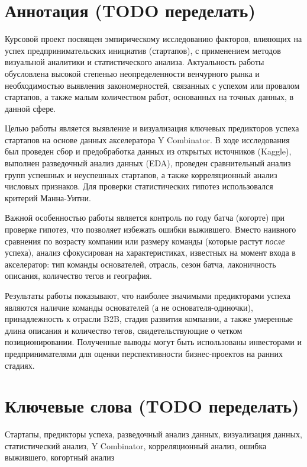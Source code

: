 \section*{Аннотация (TODO переделать)}
Курсовой проект посвящен эмпирическому исследованию факторов, влияющих на успех предпринимательских инициатив (стартапов), с применением методов визуальной аналитики и статистического анализа. Актуальность работы обусловлена высокой степенью неопределенности венчурного рынка и необходимостью выявления закономерностей, связанных с успехом или провалом стартапов, а также малым количеством работ, основанных на точных данных, в данной сфере.

Целью работы является выявление и визуализация ключевых предикторов успеха стартапов на основе данных акселератора Y Combinator. В ходе исследования был проведен сбор и предобработка данных из открытых источников (Kaggle), выполнен разведочный анализ данных (EDA), проведен сравнительный анализ групп успешных и неуспешных стартапов, а также корреляционный анализ числовых признаков. Для проверки статистических гипотез использовался критерий Манна-Уитни.

Важной особенностью работы является контроль по году батча (когорте) при проверке гипотез, что позволяет избежать ошибки выжившего. Вместо наивного сравнения по возрасту компании или размеру команды (которые растут \emph{после} успеха), анализ сфокусирован на характеристиках, известных на момент входа в акселератор: тип команды основателей, отрасль, сезон батча, лаконичность описания, количество тегов и география.

Результаты работы показывают, что наиболее значимыми предикторами успеха являются наличие команды основателей (а не основателя-одиночки), принадлежность к отрасли B2B, стадия развития компании, а также умеренные длина описания и количество тегов, свидетельствующие о четком позиционировании. Полученные выводы могут быть использованы инвесторами и предпринимателями для оценки перспективности бизнес-проектов на ранних стадиях.


\section*{Ключевые слова (TODO переделать)}
Стартапы, предикторы успеха, разведочный анализ данных, визуализация данных, статистический анализ, Y Combinator, корреляционный анализ, ошибка выжившего, когортный анализ
\pagebreak
